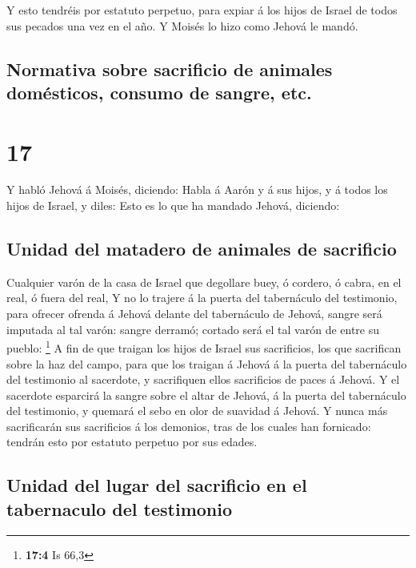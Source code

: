  Y esto tendréis por estatuto perpetuo, para expiar á los
hijos de Israel de todos sus pecados una vez en el año. Y Moisés lo hizo
como Jehová le mandó.

\hypertarget{normativa-sobre-sacrificio-de-animales-domuxe9sticos-consumo-de-sangre-etc.}{%
\subsection{Normativa sobre sacrificio de animales domésticos, consumo
de sangre,
etc.}\label{normativa-sobre-sacrificio-de-animales-domuxe9sticos-consumo-de-sangre-etc.}}

\hypertarget{section-16}{%
\section{17}\label{section-16}}

 Y habló Jehová á Moisés, diciendo:  Habla á
Aarón y á sus hijos, y á todos los hijos de Israel, y diles: Esto es lo
que ha mandado Jehová, diciendo:

\hypertarget{unidad-del-matadero-de-animales-de-sacrificio}{%
\subsection{Unidad del matadero de animales de
sacrificio}\label{unidad-del-matadero-de-animales-de-sacrificio}}

 Cualquier varón de la casa de Israel que degollare buey,
ó cordero, ó cabra, en el real, ó fuera del real,  Y no lo
trajere á la puerta del tabernáculo del testimonio, para ofrecer ofrenda
á Jehová delante del tabernáculo de Jehová, sangre será imputada al tal
varón: sangre derramó; cortado será el tal varón de entre su pueblo:
\footnote{\textbf{17:4} Is 66,3}  A fin de que traigan los
hijos de Israel sus sacrificios, los que sacrifican sobre la haz del
campo, para que los traigan á Jehová á la puerta del tabernáculo del
testimonio al sacerdote, y sacrifiquen ellos sacrificios de paces á
Jehová.  Y el sacerdote esparcirá la sangre sobre el altar
de Jehová, á la puerta del tabernáculo del testimonio, y quemará el sebo
en olor de suavidad á Jehová.  Y nunca más sacrificarán
sus sacrificios á los demonios, tras de los cuales han fornicado:
tendrán esto por estatuto perpetuo por sus edades.

\hypertarget{unidad-del-lugar-del-sacrificio-en-el-tabernaculo-del-testimonio}{%
\subsection{Unidad del lugar del sacrificio en el tabernaculo del
testimonio}\label{unidad-del-lugar-del-sacrificio-en-el-tabernaculo-del-testimonio}}

